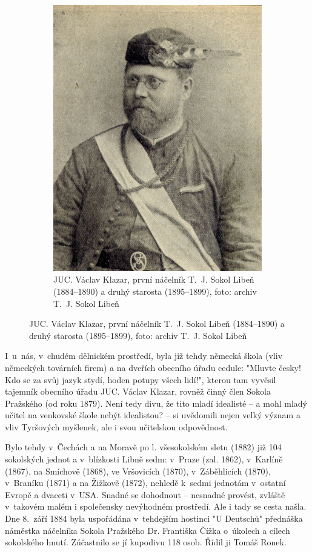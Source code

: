 \documentclass[a5paper, 11pt, twoside]{article}
\begin{document}
\begin{figure}[h]
\begin{subfigure}{0.45\textwidth}
   \includegraphics[width=\textwidth]{img/02_klazar.jpg}
  \caption*{JUC. Václav Klazar, první náčelník T.~J. Sokol Libeň (1884–⁠⁠⁠⁠⁠⁠1890) a druhý starosta (1895–⁠⁠⁠⁠⁠⁠1899), foto: archiv T.~J. Sokol Libeň}
  \end{subfigure}
\end{figure}

I~u~nás, v~chudém dělnickém prostředí, byla již tehdy německá škola (vliv německých továrních firem) a na dveřích obecního úřadu cedule: "Mluvte česky! Kdo se za svůj jazyk stydí, hoden potupy všech lidí!", kterou tam vyvěsil tajemník obecního úřadu JUC. Václav Klazar, rovněž činný člen Sokola Pražského (od roku 1879). Není tedy divu, že tito mladí idealisté --⁠⁠⁠⁠⁠⁠ a mohl mladý učitel na venkovské škole nebýt
idealistou? --⁠⁠⁠⁠⁠⁠ si uvědomili nejen velký význam a vliv Tyršových
myšlenek, ale i svou učitelskou odpovědnost.

Bylo tehdy v~Čechách a na Moravě po l. všesokolském sletu (1882) již 104 sokolských jednot a v~blízkosti Libně sedm: v~Praze (zal. 1862), v~Karlíně (1867), na Smíchově (1868), ve Vršovicích (1870), v~Záběhlicích (1870), v~Braníku (1871) a na Žižkově (1872), nehledě k~sedmi jednotám v~ostatní Evropě a dvaceti v~USA. Snadné se dohodnout -- nesnadné provést, zvláště v~takovém malém i společensky nevýhodném prostředí. Ale i tady se cesta našla. Dne 8.~září 1884 byla uspořádána v~tehdejším hostinci "U Deutschů" přednáška náměstka náčelníka Sokola Pražského Dr. Františka Čížka o~úkolech a cílech sokolského hnutí. Zúčastnilo se jí kupodivu 118 osob. Řídil ji Tomáš Ronek.
\end{document}
